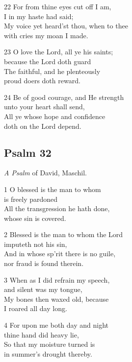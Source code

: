 22 For from thine eyes cut off I am,\\
I in my haste had said;\\
My voice yet heard’st thou, when to thee\\
with cries my moan I made.

23 O love the Lord, all ye his saints;\\
because the Lord doth guard\\
The faithful, and he plenteously\\
proud doers doth reward.

24 Be of good courage, and He strength\\
unto your heart shall send,\\
All ye whose hope and confidence\\
doth on the Lord depend.

\begin{center}
\quad{}\quad{}
\end{center}

\subsection*{Psalm 32 }

\emph{A Psalm} of David, Maschil.

1 O blessed is the man to whom\\
is freely pardoned\\
All the transgression he hath done,\\
whose sin is covered.

2 Blessed is the man to whom the Lord\\
imputeth not his sin,\\
And in whose sp’rit there is no guile,\\
nor fraud is found therein.

3 When as I did refrain my speech,\\
and silent was my tongue,\\
My bones then waxed old, because\\
I roared all day long.

4 For upon me both day and night\\
thine hand did heavy lie,\\
So that my moisture turned is\\
in summer’s drought thereby.

